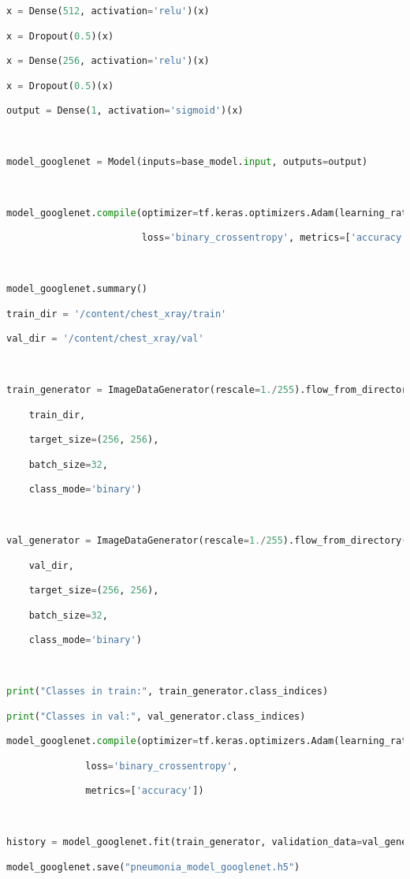 \documentclass{article}
\begin{document}
\begin{lstlisting}[style=mystyle,language=Python]
x = Dense(512, activation='relu')(x)

x = Dropout(0.5)(x)

x = Dense(256, activation='relu')(x)

x = Dropout(0.5)(x)

output = Dense(1, activation='sigmoid')(x)



model_googlenet = Model(inputs=base_model.input, outputs=output)



model_googlenet.compile(optimizer=tf.keras.optimizers.Adam(learning_rate=0.0001),

                        loss='binary_crossentropy', metrics=['accuracy'])



model_googlenet.summary()

train_dir = '/content/chest_xray/train'

val_dir = '/content/chest_xray/val'



train_generator = ImageDataGenerator(rescale=1./255).flow_from_directory(

    train_dir,

    target_size=(256, 256),

    batch_size=32,

    class_mode='binary')



val_generator = ImageDataGenerator(rescale=1./255).flow_from_directory(

    val_dir,

    target_size=(256, 256),

    batch_size=32,

    class_mode='binary')



print("Classes in train:", train_generator.class_indices)

print("Classes in val:", val_generator.class_indices)

model_googlenet.compile(optimizer=tf.keras.optimizers.Adam(learning_rate=0.0001),

              loss='binary_crossentropy',

              metrics=['accuracy'])



history = model_googlenet.fit(train_generator, validation_data=val_generator, epochs=10)

model_googlenet.save("pneumonia_model_googlenet.h5")


\end{lstlisting}
\end{document}
